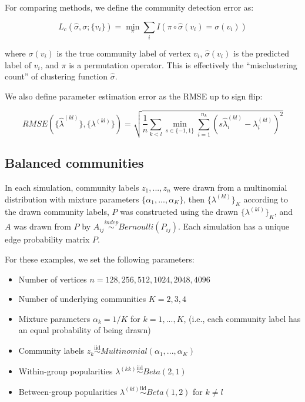 \documentclass[
  12pt,
]{article}
\providecommand{\tightlist}{%
  \setlength{\itemsep}{0pt}\setlength{\parskip}{0pt}}
\begin{document}
For comparing methods, we define the community detection error as:

\[L_c(\hat{\sigma}, \sigma; \{v_i\}) = 
\min_\pi \sum_i I(\pi \circ \hat{\sigma}(v_i) = \sigma(v_i))\]

where \(\sigma(v_i)\) is the true community label of vertex \(v_i\),
\(\hat{\sigma}(v_i)\) is the predicted label of \(v_i\), and \(\pi\) is
a permutation operator. This is effectively the ``misclustering count''
of clustering function \(\hat{\sigma}\).

We also define parameter estimation error as the RMSE up to sign flip:

\[RMSE(\{\hat{\lambda}^{(kl)}\}, \{\lambda^{(kl)}\}) = 
\sqrt{\frac{1}{n} \sum_{k < l} \min_{s \in \{-1, 1\}} 
\sum_{i = 1}^{n_k} 
(s \hat{\lambda}^{(kl)}_i - \lambda^{(kl)}_i)^2}\]

\hypertarget{balanced-communities}{%
\subsection{Balanced communities}\label{balanced-communities}}

In each simulation, community labels \(z_1, ..., z_n\) were drawn from a
multinomial distribution with mixture parameters
\(\{\alpha_1, ..., \alpha_K\}\), then \(\{\lambda^{(kl)}\}_K\) according
to the drawn community labels, \(P\) was constructed using the drawn
\(\{\lambda^{(kl)}\}_K\), and \(A\) was drawn from \(P\) by
\(A_{ij} \stackrel{indep}{\sim} Bernoulli(P_{ij})\). Each simulation has
a unique edge probability matrix \(P\).

For these examples, we set the following parameters:

\begin{itemize}
\tightlist
\item
  Number of vertices \(n = 128, 256, 512, 1024, 2048, 4096\)
\item
  Number of underlying communities \(K = 2, 3, 4\)
\item
  Mixture parameters \(\alpha_k = 1 / K\) for \(k = 1, ..., K\), (i.e.,
  each community label has an equal probability of being drawn)
\item
  Community labels
  \(z_k \stackrel{\text{iid}}{\sim}Multinomial(\alpha_1, ..., \alpha_K)\)
\item
  Within-group popularities
  \(\lambda^{(kk)} \stackrel{\text{iid}}{\sim}Beta(2, 1)\)
\item
  Between-group popularities
  \(\lambda^{(kl)} \stackrel{\text{iid}}{\sim}Beta(1, 2)\) for
  \(k \neq l\)
\end{itemize}
\end{document}
